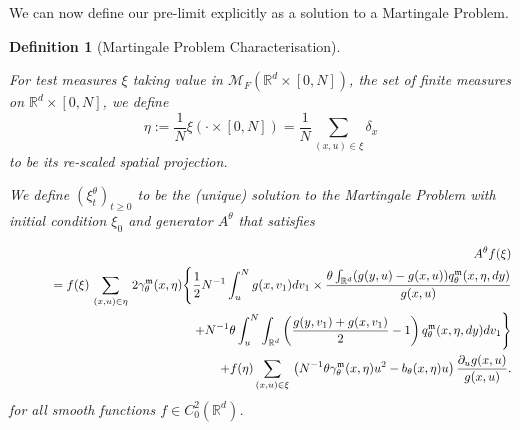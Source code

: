 \documentclass[12pt]{article}
\newtheorem{definition}[theorem]{Definition}
\def \non{{\nonumber}}
\begin{document}
We can now define our pre-limit explicitly as a solution to a Martingale Problem.
\begin{definition}[Martingale Problem Characterisation]
\label{Def: Rescaled Lookdown Models}

For test measures $\xi$ taking value in $\mathcal{M}_F(\mathbb{R}^d \times [0,N])$,
the set of finite measures on $\mathbb{R}^d \times [0,N]$,
we define
$$\eta:= \frac{1}{N}\xi(\cdot  \times [0, N])=
\frac{1}{N}\sum_{(x,u) \in \xi}\delta_x$$
to be its re-scaled spatial projection.

We define $(\xi^{\theta}_t)_{t \geq 0}$
to be the (unique) solution
to the Martingale Problem
with initial condition $\xi_0$
and generator $A^{\theta}$ that satisfies

\begin{eqnarray}\label{Eq: Prelimit Lookdown Generator}
&&A^{\theta}f(\xi ) \\
&&\quad =f(\xi )\,\sum_{(x,u)\in\eta}\,2 \gamma^{\mathfrak{m}}_{\theta}(x, \eta)\Bigg\{ \frac 12 N^{-1}\int_u^{
N}g(x,v_1)dv_1\times \frac { \theta\int_{\mathbb{R}^d}(g(y,u)-g(x,u))q^{\mathfrak{m}}_{\theta}(x,\eta,dy) }{g(x,u)}\non\\
&&\qquad\qquad\qquad\qquad\qquad\qquad\qquad +N^{-1}\theta\int_u^{
N}\int_{\mathbb{R}^d}\left(\frac{g(y,v_1)+g(x,v_1)}{2}-1\right)q^{\mathfrak{m}}_{\theta}(x,\eta,dy)dv_1\nonumber\Bigg\}\\
&&\qquad\qquad
+f(\eta )\sum_{(x,u)\in\xi}\,\left(N^{-1} \theta \gamma^{\mathfrak{m}}_{\theta}(x,\eta) u^2 -b_{\theta}(x,\eta)u\right)\frac {\partial_u g(x,u)}{g(x,u)}.\nonumber
\end{eqnarray}
for all smooth functions $f \in C^{2}_{0}(\mathbb{R}^d)$. 
\end{definition}
\end{document}

